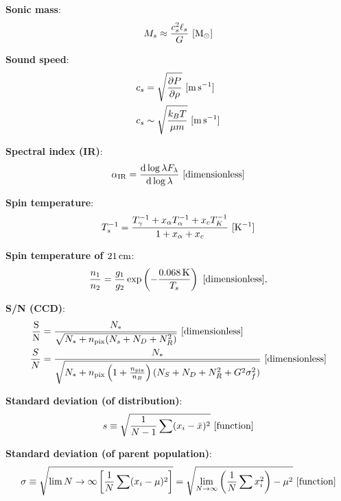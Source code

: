\documentclass[a4paper,10pt]{article}
\begin{document}
{\noindent}\textbf{Sonic mass}:
\begin{align*}
    M_s \approx \frac{c_s^2\ell_s}{G} ~ [{\rm M_\odot}]
\end{align*}

{\noindent}\textbf{Sound speed}:
\begin{align*}
    c_s &= \sqrt{\frac{\partial P}{\partial\rho}} ~ [{\rm m\,s^{-1}}] \\
    c_s &\sim \sqrt{\frac{k_BT}{\mu m}} ~ [{\rm m\,s^{-1}}]
\end{align*}

{\noindent}\textbf{Spectral index (IR)}:
\begin{align*}
    \alpha_{\rm IR} = \frac{{\rm d}\log\lambda F_\lambda}{{\rm d}\log \lambda} ~ [{\rm dimensionless}]
\end{align*}

{\noindent}\textbf{Spin temperature}:
\begin{align*}
    T_s^{-1} = \frac{T_\gamma^{-1} + x_\alpha T_\alpha^{-1} + x_cT_K^{-1}}{1+x_\alpha+x_c} ~ [{\rm K^{-1}}]
\end{align*}

{\noindent}\textbf{Spin temperature of $21\,{\rm cm}$}:
\begin{align*}
    \frac{n_1}{n_2} = \frac{g_1}{g_2}\exp\left(-\frac{0.068\,{\rm K}}{T_s}\right) ~ [{\rm dimensionless}],
\end{align*}

{\noindent}\textbf{S/N (CCD)}:
\begin{align*}
    \frac{\rm S}{\rm N} &= \frac{N_*}{\sqrt{N_*+n_{\rm pix}(N_s+N_D+N_R^2)}} ~ [{\rm dimensionless}] \\
    \frac{S}{N} &= \frac{N_*}{\sqrt{N_*+n_{\rm pix}\left(1+\frac{n_{\rm pix}}{n_B}\right)(N_S+N_D+N_R^2+G^2\sigma_f^2)}} ~ [{\rm dimensionless}]
\end{align*}

{\noindent}\textbf{Standard deviation (of distribution)}:
\begin{align*}
    s \equiv \sqrt{\frac{1}{N-1} \sum (x_i-\bar{x})^2} ~ [{\rm function}]
\end{align*}

{\noindent}\textbf{Standard deviation (of parent population)}:
\begin{align*}
    \sigma \equiv \sqrt{\lim{N\rightarrow\infty} \left[\frac{1}{N}\sum(x_i-\mu)^2\right]} = \sqrt{\lim_{N\rightarrow\infty} \left(\frac{1}{N}\sum x_i^2\right)-\mu^2} ~ [{\rm function}]
\end{align*}
\end{document}
